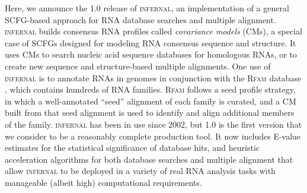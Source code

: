 
Here, we announce the 1.0 release of \textsc{infernal}, an
implementation of a general SCFG-based approach for RNA database
searches and multiple alignment. \textsc{infernal} builds consensus
RNA profiles called \emph{covariance models} (CMs), a special case of
SCFGs designed for modeling RNA consensus sequence and structure. It
uses CMs to search nucleic acid sequence databases for homologous
RNAs, or to create new sequence and structure-based multiple %
alignments. One use of \textsc{infernal} is to annotate RNAs in
genomes in conjunction with the \textsc{Rfam} database
\citep{Gardner09}, which contains hundreds of RNA families.
\textsc{Rfam} follows a seed profile strategy, in which a
well-annotated ``seed'' alignment of each family is curated, and a CM
built from that seed alignment is used to identify and align
additional members of the family.  \textsc{infernal} has been in use
since 2002, but 1.0 is the first version that we consider to be a
reasonably complete production tool. It now includes E-value estimates
for the statistical significance of database hits, and heuristic
acceleration algorithms for both database searches and multiple
alignment that allow \textsc{infernal} to be deployed in a variety of
real RNA analysis tasks with manageable (albeit high) computational
requirements.

